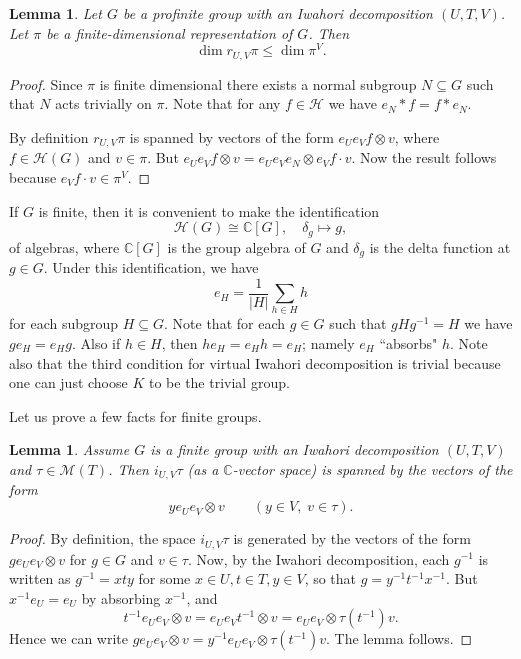 \documentclass[10pt, letterpaper]{amsart}
\theoremstyle{plain}
\newtheorem{Lem}[equation]{Lemma}
\theoremstyle{definition}
\numberwithin{equation}{section}
\newcommand{\C}{\mathbb{C}}
\newcommand{\Hcal}{\mathcal{H}}
\begin{document}
\begin{Lem}\label{L:ResDimBound}
    Let $G$ be a profinite group with an Iwahori decomposition $(U,T,V)$. Let $\pi$ be a finite-dimensional representation of $G$. Then
    \begin{equation*}
        \dim r_{U,V}\pi\leq \dim \pi^{V}.
    \end{equation*}
\end{Lem}

\begin{proof}
    Since $\pi$ is finite dimensional there exists a normal subgroup $N\subseteq G$ such that $N$ acts trivially on $\pi$. Note that for any $f\in\mathcal{H}$ we have $e_{N}*f=f*e_{N}$.
    
    By definition $r_{U,V}\pi$ is spanned by vectors of the form $e_{U}e_{V}f\otimes v$, where $f\in \mathcal{H}(G)$ and $v\in\pi$. But $e_{U}e_{V}f\otimes v=e_{U}e_{V}e_{N}\otimes e_{V}f\cdot v$. Now the result follows because $e_{V}f\cdot v\in \pi^{V}$.
\end{proof}

If $G$ is finite, then it is convenient to make the identification
\[
\Hcal(G)\cong\C[G], \quad \delta_g\mapsto g,
\]
of algebras, where $\C[G]$ is the group algebra of $G$ and $\delta_g$ is the delta function at $g\in G$. Under this identification, we have
\begin{equation}\label{E:e_H_idempotent}
e_H=\frac{1}{|H|}\sum_{h\in H}h
\end{equation}
for each subgroup $H\subseteq G$. Note that for each $g\in G$ such that $gHg^{-1}=H$ we have $ge_H=e_Hg$. Also if $h\in H$, then $he_H=e_Hh=e_H$; namely $e_H$ ``absorbs" $h$. Note also that the third condition for virtual Iwahori decomposition is trivial because one can just choose $K$ to be the trivial group.

Let us prove a few facts for finite groups.
\begin{Lem}\label{L:spanning_vectors}
Assume $G$ is a finite group with an Iwahori decomposition $(U, T, V)$ and $\tau\in\mathcal{M}(T)$. Then $i_{U, V}\tau$ (as a $\C$-vector space) is spanned by the vectors of the form
\[
ye_Ue_V\otimes v\qquad (y\in V,\; v\in\tau).
\]
\end{Lem}
\begin{proof}
By definition, the space $i_{U, V}\tau$ is generated by the vectors of the form $ge_Ue_V\otimes v$ for $g\in G$ and $v\in\tau$. Now, by the Iwahori decomposition, each $g^{-1}$ is written as $g^{-1}=x t y$ for some $x\in U, t\in T, y\in V$, so that $g=y^{-1}t^{-1} x^{-1}$. But $x^{-1}e_U=e_U$ by absorbing $x^{-1}$, and 
\[
t^{-1}e_Ue_V\otimes v=e_Ue_Vt^{-1}\otimes v=e_Ue_V\otimes \tau(t^{-1})v.
\]
Hence we can write $ge_Ue_V\otimes v=y^{-1}e_Ue_V\otimes \tau(t^{-1})v$. The lemma follows.
\end{proof}
\end{document}
